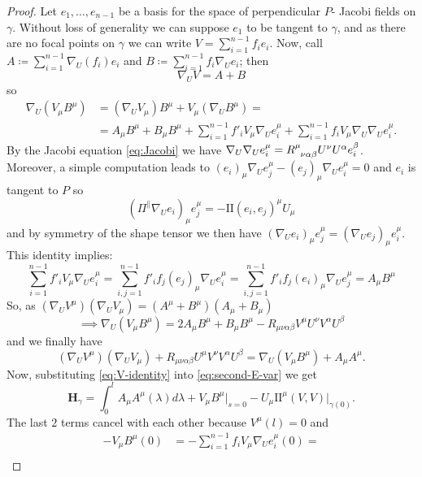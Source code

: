 \begin{proof}
	Let \(e_1, \ldots, e_{n - 1}\) be a basis for the space of perpendicular \(P\)- Jacobi fields on \(\gamma\). Without loss of generality we can suppose \(e_1\) to be tangent to \(\gamma\), and as there are no focal points on \(\gamma\) we can write \(V = \sum_{i = 1}^{n - 1} f_ie_i\).
	Now, call \(A \coloneqq \sum_{i = 1}^{n - 1} \nabla_U(f_i)e_i\) and \(B \coloneqq \sum_{i = 1}^{n - 1} f_i\nabla_Ue_i\); then
	\[
	\nabla_UV = A + B
	\]
	so
	\begin{align*}
		\nabla_U(V_{\mu}B^{\mu}) &= (\nabla_UV_{\mu})B^{\mu} + V_{\mu}(\nabla_UB^{\mu}) = \\
		 &= A_{\mu}B^{\mu} + B_{\mu}B^{\mu} + \sum_{i = 1}^{n - 1}f'_iV_{\mu}\nabla_Ue_i^{\mu} + \sum_{i = 1}^{n - 1}f_iV_{\mu}\nabla_U\nabla_Ue_i^{\mu}.
	\end{align*}
	By the Jacobi equation \eqref{eq:Jacobi} we have \(\nabla_U\nabla_Ue_i^{\mu} = R\indices{^{\mu}_{\nu\alpha\beta}}U^{\nu}U^{\alpha}e_i^{\beta}\). Moreover, a simple computation leads to \((e_i)_{\mu}\nabla_Ue_j^{\mu} - (e_j)_{\mu}\nabla_Ue_i^{\mu} = 0\) and \(e_i\) is tangent to \(P\) so
	\[
	(\Pi^{\parallel}\nabla_Ue_i)_{\mu}e_j^{\mu} = - \mathrm{I\!I}(e_i, e_j)^{\mu}U_{\mu}
	\]
	and by symmetry of the shape tensor we then have \((\nabla_Ue_i)_{\mu}e_j^{\mu} = (\nabla_Ue_j)_{\mu}e_i^{\mu}\). This identity implies:
	\[
	\sum_{i = 1}^{n - 1}f'_iV_{\mu}\nabla_Ue_i^{\mu} = \sum_{i, j = 1}^{n - 1}f'_if_j(e_j)_{\mu}\nabla_Ue_i^{\mu} = \sum_{i, j = 1}^{n - 1}f'_if_j(e_i)_{\mu}\nabla_Ue_j^{\mu} = A_{\mu}B^{\mu}
	\]
	So, as \((\nabla_UV^{\mu})(\nabla_UV_{\mu}) = (A^{\mu} + B^{\mu}) (A_{\mu} + B_{\mu})\)
	\[
	\implies \nabla_U(V_{\mu}B^{\mu}) = 2A_{\mu}B^{\mu} + B_{\mu}B^{\mu} - R_{\mu\nu\alpha\beta}V^{\mu}U^{\nu}V^{\alpha}U^{\beta}
	\]
	and we finally have
	\begin{equation}
	\label{eq:V-identity}
		(\nabla_UV^{\mu})(\nabla_UV_{\mu}) + R_{\mu\nu\alpha\beta}U^{\mu}V^{\nu}V^{\alpha}U^{\beta} =  \nabla_U(V_{\mu}B^{\mu})  + A_{\mu}A^{\mu}.
	\end{equation}
	Now, substituting \eqref{eq:V-identity} into \eqref{eq:second-E-var} we get
	\[
	\textbf{H}_{\gamma} = \int_{0}^{l} A_{\mu}A^{\mu}(\lambda) d\lambda + V_{\mu}B^{\mu}\Big\vert_{s = 0} - U_{\mu}\mathrm{I\!I}^{\mu}(V, V)\vert_{\gamma(0)}.
	\]
	The last \(2\) terms cancel with each other because \(V^{\mu}(l) = 0\) and 
	\begin{align*}
		-V_{\mu}B^{\mu}(0) &= - \sum_{i = 1}^{n - 1}f_i V_{\mu}\nabla_Ue_i^{\mu}(0) =\\

\end{align*}
\end{proof}
